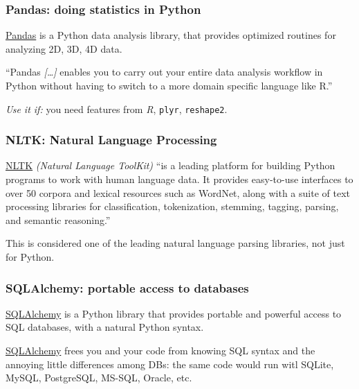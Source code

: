 \documentclass[english,serif,mathserif,xcolor=pdftex,dvipsnames,table]{beamer}
\begin{document}
\begin{frame}
  \frametitle{Pandas: doing statistics in Python}

  \href{http://pandas.pydata.org/}{Pandas} is a Python data analysis
  library, that provides optimized routines for analyzing 2D, 3D, 4D
  data.

  \+ ``Pandas \emph{[\ldots]} enables you to carry out your entire
  data analysis workflow in Python without having to switch to a more
  domain specific language like R.''

  \+ \emph{Use it if:} you need features from \emph{R}, \texttt{plyr},
  \texttt{reshape2}.
\end{frame}


\begin{frame}
  \frametitle{NLTK: Natural Language Processing}

  \href{http://nltk.org/}{NLTK} \emph{(Natural Language ToolKit)} ``is
  a leading platform for building Python programs to work with human
  language data. It provides easy-to-use interfaces to over 50 corpora
  and lexical resources such as WordNet, along with a suite of text
  processing libraries for classification, tokenization, stemming,
  tagging, parsing, and semantic reasoning.''

  \+ This is considered one of the leading natural language parsing
  libraries, not just for Python.
\end{frame}


\begin{frame}
  \frametitle{SQLAlchemy: portable access to databases}

  \href{http://www.sqlalchemy.org/}{SQLAlchemy} is a Python library
  that provides portable and powerful access to SQL databases, with a
  natural Python syntax.

  \+ \href{http://www.sqlalchemy.org/}{SQLAlchemy} frees you and your
  code from knowing SQL syntax and the annoying little differences
  among DBs: the same code would run witl SQLite, MySQL, PostgreSQL,
  MS-SQL, Oracle, etc.
\end{frame}
\end{document}
